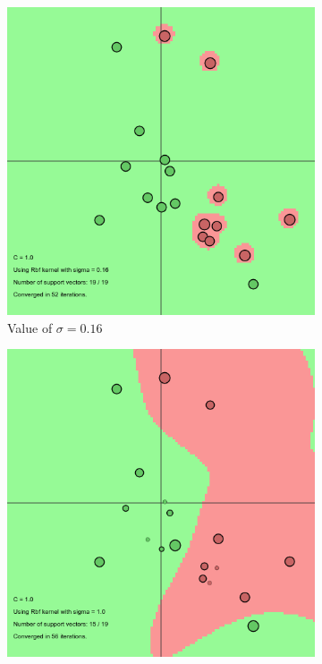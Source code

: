 \documentclass[11pt, a4paper]{article}
\begin{document}
\begin{figure}[H]
    \centering
    \begin{subfigure}{.25\textwidth}
      \centering
      \includegraphics[width=0.9\linewidth]{1-2-1-kernel_ssigma.png}
      \caption{Value of $\sigma = 0.16$}
      \label{fig:rbfs1}
    \end{subfigure}%
    \begin{subfigure}{.25\textwidth}
      \centering
      \includegraphics[width=0.9\linewidth]{1-2-1-kernel_ssigma1.png}

\end{subfigure}
\end{figure}
\end{document}
